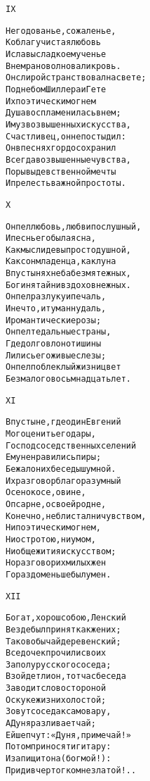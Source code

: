\begin{minipage}[t]{\dimexpr 0.5\textwidth -\tabcolsep-.5pt}
\begin{alltt}\normalfont\centering
IX

Негодованье, сожаленье,
Ко благу чистая любовь
И славы сладкое мученье
В нем рано волновали кровь.
Он с лирой странствовал на свете;
Под небом Шиллера и Гете
Их поэтическим огнем
Душа воспламенилась в нем;
И муз возвышенных искусства,
Счастливец, он не постыдил:
Он в песнях гордо сохранил
Всегда возвышенные чувства,
Порывы девственной мечты
И прелесть важной простоты.
\end{alltt}
\end{minipage}

\begin{minipage}[t]{\dimexpr 0.5\textwidth -\tabcolsep-.5pt}
\begin{alltt}\normalfont\centering
X

Он пел любовь, любви послушный,
И песнь его была ясна,
Как мысли девы простодушной,
Как сон младенца, как луна
В пустынях неба безмятежных,
Богиня тайн и вздохов нежных.
Он пел разлуку и печаль,
И нечто, и туманну даль,
И романтические розы;
Он пел те дальные страны,
Где долго в лоно тишины
Лились его живые слезы;
Он пел поблеклый жизни цвет
Без малого в осьмнадцать лет.
\end{alltt}
\end{minipage}
\clearpage

\begin{minipage}[t]{\dimexpr 0.5\textwidth -\tabcolsep-.5pt}
\begin{alltt}\normalfont\centering
XI

В пустыне, где один Евгений
Мог оценить его дары,
Господ соседственных селений
Ему не нравились пиры;
Бежал он их беседы шумной.
Их разговор благоразумный
О сенокосе, о вине,
О псарне, о своей родне,
Конечно, не блистал ни чувством,
Ни поэтическим огнем,
Ни остротою, ни умом,
Ни общежития искусством;
Но разговор их милых жен
Гораздо меньше был умен.
\end{alltt}
\end{minipage}

\begin{minipage}[t]{\dimexpr 0.5\textwidth -\tabcolsep-.5pt}
\begin{alltt}\normalfont\centering
XII

Богат, хорош собою, Ленский
Везде был принят как жених;
Таков обычай деревенский;
Все дочек прочили своих
За полурусского соседа;
Взойдет ли он, тотчас беседа
Заводит слово стороной
О скуке жизни холостой;
Зовут соседа к самовару,
А Дуня разливает чай;
Ей шепчут: «Дуня, примечай!»
Потом приносят и гитару:
И запищит она (бог мой!):
Приди в чертог ко мне златой!..
\end{alltt}
\end{minipage}
\clearpage

